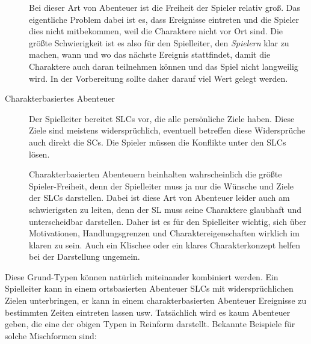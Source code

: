 \begin{description}
    Bei dieser Art von Abenteuer ist die Freiheit der Spieler relativ groß. 
    Das eigentliche Problem dabei ist es, dass Ereignisse eintreten und die Spieler
    dies nicht mitbekommen, weil die Charaktere nicht vor Ort sind.
    Die größte Schwierigkeit ist es also für den
    Spielleiter, den \emph{Spielern} klar zu machen, wann und wo das nächste Ereignis
    stattfindet, damit die Charaktere auch daran teilnehmen können und das
    Spiel nicht langweilig wird. In der Vorbereitung sollte daher darauf viel
    Wert gelegt werden.

\item[Charakterbasiertes Abenteuer]
    Der Spielleiter bereitet SLCs vor, die alle persönliche Ziele haben.  Diese
    Ziele sind meistens widersprüchlich, eventuell betreffen diese Widersprüche
    auch direkt die SCs. Die Spieler müssen die Konflikte unter den SLCs lösen.

    Charakterbasierten Abenteuern beinhalten wahrscheinlich die größte 
    Spieler-Freiheit, denn der Spielleiter muss ja nur die Wünsche und Ziele
    der SLCs darstellen. Dabei ist diese Art von Abenteuer leider auch am
    schwierigsten zu leiten,
    denn der SL muss seine Charaktere glaubhaft und unterscheidbar darstellen.
    Daher ist es für den Spielleiter wichtig, sich über Motivationen,
    Handlungsgrenzen und Charaktereigenschaften wirklich im klaren zu sein.
    Auch ein Klischee oder ein klares Charakterkonzept helfen bei der
    Darstellung ungemein.
\end{description}

Diese Grund-Typen können natürlich miteinander kombiniert werden. Ein
Spielleiter kann in einem ortsbasierten Abenteuer SLCs mit widersprüchlichen
Zielen unterbringen, er kann in einem charakterbasierten Abenteuer Ereignisse
zu bestimmten Zeiten eintreten lassen usw. Tatsächlich wird es kaum Abenteuer
geben, die eine der obigen Typen in Reinform darstellt. Bekannte Beispiele für solche
Mischformen sind:

